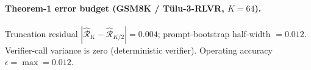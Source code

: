 \paragraph{Theorem-1 error budget (GSM8K / Tülu-3-RLVR, $K{=}64$).} Truncation residual $|\hat{\mathcal R}_K - \hat{\mathcal R}_{K/2}| = 0.004$; prompt-bootstrap half-width $= 0.012$. Verifier-call variance is zero (deterministic verifier). Operating accuracy $\epsilon = \max{} = 0.012$.